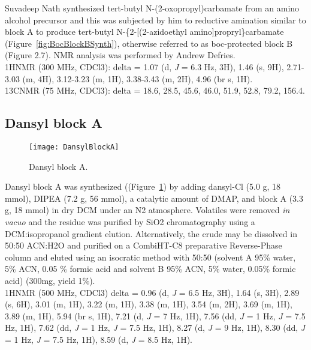 Suvadeep Nath synthesized tert-butyl N-(2-oxopropyl)carbamate from an amino alcohol precursor and this was subjected by him to reductive amination similar to block A to produce tert-butyl N-\{2-[(2-azidoethyl amino]propryl\}carbamate (Figure~\ref{fig:BocBlockBSynth}), otherwise referred to as boc-protected block B (Figure 2.7). NMR analysis was performed by Andrew Defries. \\

\noindent
1HNMR (300 MHz, CDCl3): delta = 1.07 (d, {\it J} = 6.3 Hz, 3H), 1.46 (s, 9H), 2.71-3.03 (m, 4H), 3.12-3.23 (m, 1H), 3.38-3.43 (m, 2H), 4.96 (br s, 1H). \\

\noindent
13CNMR (75 MHz, CDCl3): delta = 18.6, 28.5, 45.6, 46.0, 51.9, 52.8, 79.2, 156.4. \\

\clearpage

\subsection{Dansyl block A}

\begin{figure}
\centering
\texttt{[image: DansylBlockA]}
\caption{Dansyl block A.}
\label{fig:DansylBlockASynth}
\end{figure}

Dansyl block A was synthesized ((Figure~\ref{fig:DansylBlockASynth}) by adding dansyl-Cl (5.0 g, 18 mmol), DIPEA (7.2 g, 56 mmol), a catalytic amount of DMAP, and block A (3.3 g, 18 mmol) in dry DCM under an N2 atmosphere. Volatiles were removed {\it in vacuo} and the residue was purified by SiO2 chromatography using a DCM:isopropanol gradient elution. Alternatively, the crude may be dissolved in 50:50 ACN:H2O and purified on a CombiHT-C8 preparative Reverse-Phase column and eluted using an isocratic method with 50:50 (solvent A 95{\%} water, 5{\%} ACN, 0.05 {\%} formic acid and solvent B 95{\%} ACN, 5{\%} water, 0.05{\%} formic acid) (300mg, yield 1{\%}). \\

\noindent
1HNMR (500 MHz, CDCl3) delta = 0.96 (d, {\it J} = 6.5 Hz, 3H), 1.64 (s, 3H), 2.89 (s, 6H), 3.01 (m, 1H), 3.22 (m, 1H), 3.38 (m, 1H), 3.54 (m, 2H), 3.69 (m, 1H), 3.89 (m, 1H), 5.94 (br s, 1H), 7.21 (d, {\it J} = 7 Hz, 1H), 7.56 (dd, {\it J} = 1 Hz, {\it J} = 7.5 Hz, 1H), 7.62 (dd, {\it J} = 1 Hz, {\it J} = 7.5 Hz, 1H), 8.27 (d, {\it J} = 9 Hz, 1H), 8.30 (dd, {\it J} = 1 Hz, {\it J} = 7.5 Hz, 1H), 8.59 (d, {\it J} = 8.5 Hz, 1H). \\

